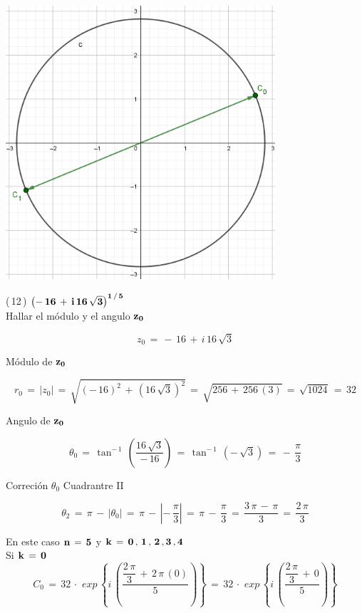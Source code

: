 \documentclass[a4paper,11pt,openany]{book}
\begin{document}
\begin{center}
    \includegraphics[width=10cm]{Gra-Ej-11.png}
\end{center}

\textcolor{ao(english)}{(\,12\,)} $\bf{\left(-\,16\,+\,i\,16\,\sqrt{3}\right)^{1\,/\,5}}$\\

\textcolor{ao(english)}{} Hallar el módulo y el angulo $\bf{z_{0}}$

$$z_{0}\,=\,-\,16\,+\,i\,16\,\sqrt{3}$$

\textcolor{ao(english)}{} Módulo de $\bf{z_{0}}$

$$r_{0}\,=\,|z_{0}|\,=\,\sqrt{\left(-\,16\right)^{2}\,+\,\left(16\,\sqrt{3}\right)^{2}}\,=\,\sqrt{256\,+\,256\,\left(3\right)}\,=\,\sqrt{1024}\,=\,32$$

\textcolor{ao(english)}{} Angulo de $\bf{z_{0}}$

$$\theta_{0}\,=\,\tan^{-\,1}\,\left(\dfrac{16\,\sqrt{3}}{-\,16}\right)\,=\,\tan^{-\,1}\,\left(-\,\sqrt{3}\right)\,=\,-\,\dfrac{\pi}{3}$$

\textcolor{ao(english)}{} Correción $\theta_{0}$ Cuadrantre II

$$\theta_{2}\,=\,\pi\,-\,|\theta_{0}|\,=\,\pi\,-\,\left|-\,\dfrac{\pi}{3}\right|\,=\,\pi\,-\,\dfrac{\pi}{3}\,=\,\dfrac{3\,\pi\,-\,\pi}{3}\,=\,\dfrac{2\,\pi}{3}$$

\textcolor{ao(english)}{} En este caso $\bf{n\,=\,5}$ y $\bf{k\,=\,0\,,\,1\,,\,2\,,3\,,4}$\\

\textcolor{ao(english)}{} Si $\bf{k\,=\,0}$
$$C_{0}\,=\,32\,\cdot\,\,exp\,\left\{i\,\left(\dfrac{\dfrac{2\,\pi}{3}\,+\,2\,\pi\,(0)}{5}\right)\right\}\,=\,32\,\cdot\,\,exp\,\left\{i\,\left(\dfrac{\dfrac{2\,\pi}{3}\,+\,0}{5}\right)\right\}$$
\end{document}
